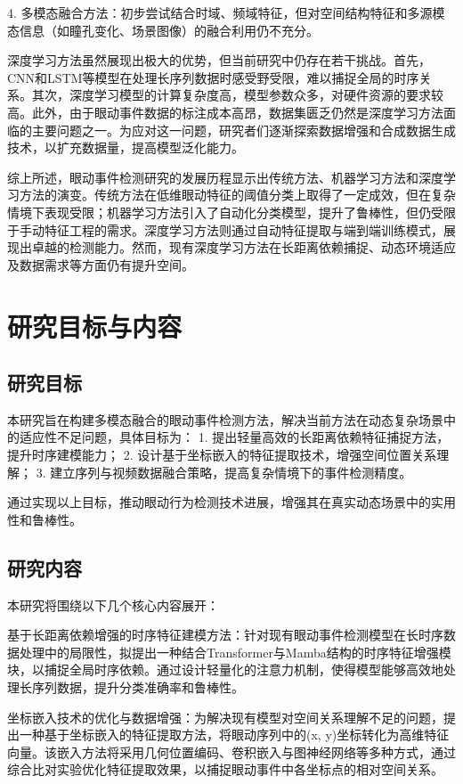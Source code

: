 \documentclass{xdupgthesis}
\begin{document}
4. 多模态融合方法：初步尝试结合时域、频域特征，但对空间结构特征和多源模态信息（如瞳孔变化、场景图像）的融合利用仍不充分。

深度学习方法虽然展现出极大的优势，但当前研究中仍存在若干挑战。首先，CNN和LSTM等模型在处理长序列数据时感受野受限，难以捕捉全局的时序关系。其次，深度学习模型的计算复杂度高，模型参数众多，对硬件资源的要求较高。此外，由于眼动事件数据的标注成本高昂，数据集匮乏仍然是深度学习方法面临的主要问题之一。为应对这一问题，研究者们逐渐探索数据增强和合成数据生成技术，以扩充数据量，提高模型泛化能力。

综上所述，眼动事件检测研究的发展历程显示出传统方法、机器学习方法和深度学习方法的演变。传统方法在低维眼动特征的阈值分类上取得了一定成效，但在复杂情境下表现受限；机器学习方法引入了自动化分类模型，提升了鲁棒性，但仍受限于手动特征工程的需求。深度学习方法则通过自动特征提取与端到端训练模式，展现出卓越的检测能力。然而，现有深度学习方法在长距离依赖捕捉、动态环境适应及数据需求等方面仍有提升空间。

\section{研究目标与内容}

\subsection{研究目标}
本研究旨在构建多模态融合的眼动事件检测方法，解决当前方法在动态复杂场景中的适应性不足问题，具体目标为：
1. 提出轻量高效的长距离依赖特征捕捉方法，提升时序建模能力；
2. 设计基于坐标嵌入的特征提取技术，增强空间位置关系理解；
3. 建立序列与视频数据融合策略，提高复杂情境下的事件检测精度。

通过实现以上目标，推动眼动行为检测技术进展，增强其在真实动态场景中的实用性和鲁棒性。

\subsection{研究内容}
本研究将围绕以下几个核心内容展开：

基于长距离依赖增强的时序特征建模方法：针对现有眼动事件检测模型在长时序数据处理中的局限性，拟提出一种结合Transformer与Mamba结构的时序特征增强模块，以捕捉全局时序依赖。通过设计轻量化的注意力机制，使得模型能够高效地处理长序列数据，提升分类准确率和鲁棒性。

坐标嵌入技术的优化与数据增强：为解决现有模型对空间关系理解不足的问题，提出一种基于坐标嵌入的特征提取方法，将眼动序列中的(x, y)坐标转化为高维特征向量。该嵌入方法将采用几何位置编码、卷积嵌入与图神经网络等多种方式，通过综合比对实验优化特征提取效果，以捕捉眼动事件中各坐标点的相对空间关系。
\end{document}
